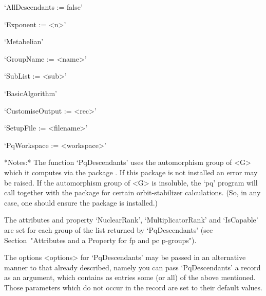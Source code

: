 \item{}`AllDescendants := false'

\item{}`Exponent := <n>'

\item{}`Metabelian'

\item{}`GroupName := <name>'

\item{}`SubList := <sub>'

\item{}`BasicAlgorithm'

\item{}`CustomiseOutput := <rec>'

\item{}`SetupFile := <filename>'

\item{}`PqWorkspace := <workspace>'

\endlist

*Notes:*
The function `PqDescendants' uses the  automorphism group of <G> which it
computes via the package {\AutPGrp}.  If this package is not installed an
error may be  raised. If the automorphism group of  <G> is insoluble, the
`pq' program  will call {\GAP}  together with the {\AutPGrp}  package for
certain  orbit-stabilizer calculations.   (So,  in any  case, one  should
ensure the {\AutPGrp} package is installed.)

The  attributes  and  property  `NuclearRank',  `MultiplicatorRank'   and
`IsCapable'  are  set  for  each  group   of   the   list   returned   by
`PqDescendants' (see Section~"Attributes and a Property  for  fp  and  pc
p-groups").

The options <options> for `PqDescendants' may be passed in an alternative
manner to that already described, namely you can pass  `PqDescendants'  a
record as an argument, which contains as entries some  (or  all)  of  the
above mentioned. Those parameters which do not occur in  the  record  are
set to their default values.

